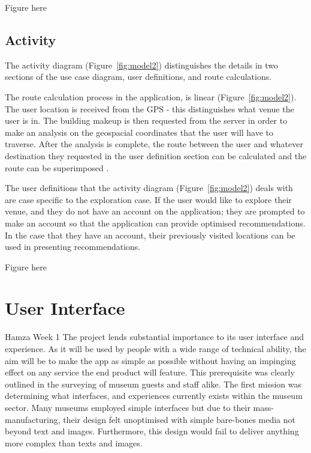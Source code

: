 Figure here

\subsection{Activity}
The activity diagram (Figure~\ref{fig:model2}) distinguishes the details in two sections of the use case diagram, user definitions, and route calculations.

The route calculation process in the application, is linear (Figure~\ref{fig:model2}). The user location is received from the GPS - this distinguishes what venue the user is in. The building makeup is then requested from the server in order to make an analysis on the geospacial coordinates that the user will have to traverse. After the analysis is complete, the route between the user and whatever destination they requested in the user definition section can be calculated and the route can be superimposed .

The user definitions that the activity diagram (Figure~\ref{fig:model2}) deals with are case specific to the exploration case. If the user would like to explore their venue, and they do not have an account on the  application; they are prompted to make an account so that the application can provide optimised recommendations. In the case that they have an account, their previously visited locations can be used in presenting recommendations.

Figure here

\section{User Interface}
Hamza Week 1
The project lends substantial importance to its user interface and experience. As it will be used by people with a wide range of technical ability, the aim will be to make the app as simple as possible without having an impinging effect on any service the end product will feature. This prerequisite was clearly outlined in the surveying of museum guests and staff alike. The first mission was determining what interfaces, and experiences currently exists within the museum sector. Many museums employed simple interfaces but due to their mass-manufacturing, their design felt unoptimised with simple bare-bones media not beyond text and images. Furthermore, this design would fail to deliver anything more complex than texts and images.
  
